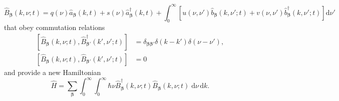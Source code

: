 \documentclass{article}
\begin{document}
\begin{equation}
\hat{B}_{\bm{\beta}}(k,\nu;t) = q(\nu)\hat{a}_{\bm{\beta}}(k,t) + s(\nu)\hat{a}_{\bm{\beta}}^\dagger(k,t) + \int_0^\infty\left[u(\nu,\nu')\hat{b}_{\bm{\beta}}(k,\nu';t) + v(\nu,\nu')\hat{b}_{\bm{\beta}}^\dagger(k,\nu';t)\right]\mathrm{d}\nu'
\end{equation}
that obey commutation relations
\begin{equation}
\begin{split}
\left[\hat{B}_{\bm{\beta}}(k,\nu;t),\hat{B}_{\bm{\beta}'}^\dagger(k',\nu';t)\right] &= \delta_{\bm{\beta}\bm{\beta}'}\delta(k - k')\delta(\nu - \nu'),\\
\left[\hat{B}_{\bm{\beta}}(k,\nu;t),\hat{B}_{\bm{\beta}'}(k',\nu';t)\right] &= 0
\end{split}
\end{equation}
and provide a new Hamiltonian
\begin{equation}
\hat{H} = \sum_{\bm{\beta}}\int_0^\infty\int_0^\infty\hbar\nu\hat{B}_{\bm{\beta}}^\dagger(k,\nu;t)\hat{B}_{\bm{\beta}}(k,\nu;t)\;\mathrm{d}\nu\,\mathrm{d}k.
\end{equation}
\end{document}
